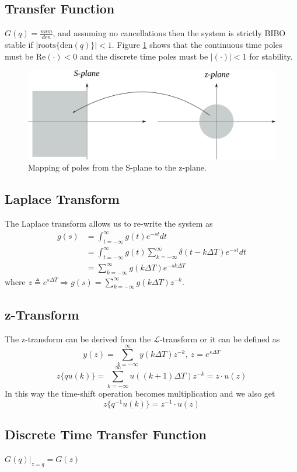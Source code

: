 \documentclass[lecture,12pt,]{pcms-l}
\theoremstyle{example}
\newcommand{\tint}{\int_{t=-\infty}^\infty}
\newcommand{\dt}{\Delta T}
\begin{document}
\subsection{Transfer Function}
$G(q) = \frac{num}{den}$, and assuming no cancellations then the system is strictly BIBO stable if $|\text{roots}\lbrace \text{den}(q)\rbrace|<1$. Figure \ref{fig:03poleMapSZ} shows that the continuous time poles must be $\text{Re}(\cdot) < 0$ and the discrete time poles must be $|(\cdot)| < 1$ for stability.
\begin{figure}[ht!]
	\centering
	\includegraphics[width=.6\textwidth]{images/03poleMapSZ}
	\caption{Mapping of poles from the S-plane to the z-plane.}
	\label{fig:03poleMapSZ}
\end{figure}

\subsection{Laplace Transform}
The Laplace transform allows us to re-write the system as
\begin{align*}
g(s) &= \tint g(t)e^{-st}dt \\
&= \tint g(t)\sum_{k=-\infty}^\infty \delta(t-k\dt)e^{-st}dt \\
&= \sum_{k=-\infty}^\infty g(k\dt)e^{-sk\dt}
\end{align*}
where $z\triangleq e^{s\dt} \Rightarrow g(s) = \sum_{k=-\infty}^\infty g(k\dt)z^{-k}$.

\subsection{z-Transform}
The z-transform can be derived from the $\mathcal{L}$-transform or it can be defined as
$$y(z) = \sum_{k=-\infty}^\infty y(k\dt)z^{-k}, ~z=e^{s\dt}$$
$$z\lbrace qu(k)\rbrace = \sum_{k=-\infty}^\infty u((k+1)\dt)z^{-k} = z\cdot u(z)$$
In this way the time-shift operation becomes multiplication and we also get
$$z\lbrace q^{-1}u(k)\rbrace = z^{-1}\cdot u(z)$$

\subsection{Discrete Time Transfer Function}
$G(q)|_{z=q} = G(z)$
\end{document}
